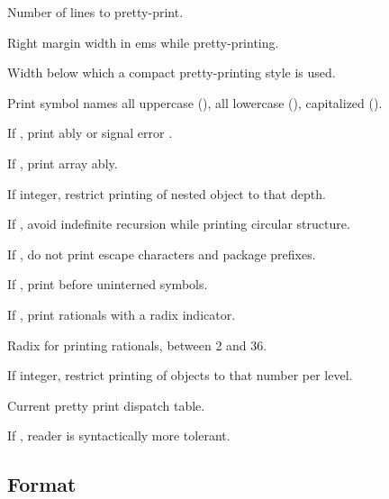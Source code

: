 \begin{LIST}{1cm}
  {
  Number of lines to pretty-print.
  }

  {
  Right margin width in ems while pretty-printing.
  }

  {
  Width below which a compact pretty-printing style is used.
  }

  {
  Print symbol names all uppercase (), all lowercase
  (), capitalized ().
  }

  {
  If \T, print ably or signal error
  . 
  }

  {
  If \T, print array ably.
  }

  {
  If integer, restrict printing of nested object to that depth.
  }

  {
  If \T, avoid indefinite recursion while printing circular
  structure. 
  }

  {
  If \NIL, do not print escape characters and package prefixes.
  }

  {
  If \T, print \kwd{:\#} before uninterned symbols.
  }

  {
  If \T, print rationals with a radix indicator.
  }

  {
  Radix for printing rationals, between 2 and 36.
  }

  {
  If integer, restrict printing of objects to that number per level.
  }

  {
  Current pretty print dispatch table.
  }

  {
  If \T, reader is syntactically more tolerant.
  }

\end{LIST}



\subsection{Format}
\label{section:Format}

